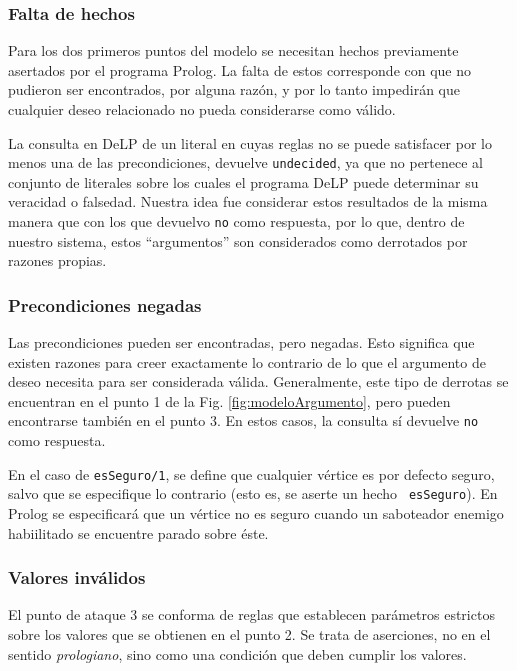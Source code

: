 \documentclass[oneside]{book}
\begin{document}
\subsubsection{Falta de hechos}

\label{sec:faltaDeHechos}

Para los dos primeros puntos del modelo se necesitan hechos previamente asertados 
por el programa Prolog. La falta de estos corresponde con que no pudieron ser 
encontrados, por alguna razón, y por lo tanto impedirán que cualquier deseo 
relacionado no pueda considerarse como válido.

La consulta en DeLP de un literal en cuyas reglas no se puede satisfacer por lo
menos una de las precondiciones, devuelve 
\texttt{undecided}, ya que no pertenece al conjunto de literales sobre los cuales
el programa DeLP puede determinar su veracidad o falsedad. Nuestra idea fue 
considerar estos resultados de la misma manera que con los que devuelvo \texttt{no}
como respuesta, por lo que, dentro de nuestro sistema, estos ``argumentos'' son
considerados como derrotados por razones propias.

\subsubsection{Precondiciones negadas}

Las precondiciones pueden ser encontradas, pero negadas. Esto significa que existen
razones para creer exactamente lo contrario de lo que el argumento de deseo 
necesita para ser considerada válida. Generalmente, este tipo de derrotas se 
encuentran en el punto 1 de la Fig. \ref{fig:modeloArgumento}, pero pueden 
encontrarse también en el punto 3. En estos casos, la consulta sí devuelve 
\texttt{no} como respuesta.

En el caso de \texttt{esSeguro/1}, se define que cualquier vértice es por defecto
seguro, salvo que se especifique lo contrario (esto es, se aserte un hecho
\texttt{~esSeguro}). En Prolog se especificará que un vértice no es seguro cuando
un saboteador enemigo habiilitado se encuentre parado sobre éste.

\subsubsection{Valores inválidos}

El punto de ataque 3 se conforma de reglas que establecen parámetros estrictos
sobre los valores que se obtienen en el punto 2. Se trata de aserciones, no en el 
sentido \textit{prologiano}, sino como una condición que deben cumplir los valores. 
\end{document}
